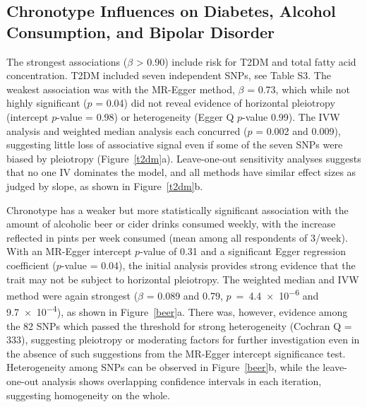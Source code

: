 \documentclass[genes,article,accept,moreauthors,pdftex]{Definitions/mdpi}
\begin{document}
\subsection{Chronotype Influences on Diabetes, Alcohol Consumption, and Bipolar Disorder}
The strongest associations ($\beta$ > 0.90) include risk for T2DM and total fatty acid concentration. T2DM included seven independent SNPs, see {{Table S3}}. The weakest association was with the MR-Egger method, $\beta$ = 0.73, which while not highly significant ($p$ = 0.04) did not reveal evidence of horizontal pleiotropy (intercept $p$-value = 0.98) or heterogeneity (Egger Q $p$-value 0.99). The IVW analysis and weighted median analysis each concurred ($p$ = 0.002 and 0.009), suggesting little loss of associative signal even if some of the seven SNPs were biased by pleiotropy (Figure~\ref{t2dm}a). Leave-one-out sensitivity analyses suggests that no one IV dominates the model, and all methods have similar effect sizes as judged by slope, as shown in Figure~\ref{t2dm}b. 

Chronotype has a weaker but more statistically significant association with the amount of alcoholic beer or cider drinks consumed weekly, with the increase reflected in pints per week consumed (mean among all respondents of 3/week). With an MR-Egger intercept $p$-value of 0.31 and a significant Egger regression coefficient ($p$-value = 0.04), the initial analysis provides strong evidence that the trait may not be subject to horizontal pleiotropy. The weighted median and IVW method were again strongest ($\beta$ = 0.089 and 0.79, \mbox{$p$ = \num{4.4e-6}} and \num{9.7e-4}), as shown in Figure~\ref{beer}a. There was, however, evidence among the 82 SNPs which passed the threshold for strong heterogeneity (Cochran Q = 333), suggesting pleiotropy or moderating factors for further investigation even in the absence of such suggestions from the MR-Egger intercept significance test. Heterogeneity among SNPs can be observed in Figure~\ref{beer}b, while the leave-one-out analysis shows overlapping confidence intervals in each iteration, suggesting homogeneity on the whole.
\end{document}
